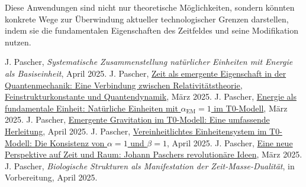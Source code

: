 \documentclass[12pt,a4paper]{article}
\newcommand{\alphaEM}{\alpha_{\text{EM}}}
\begin{document}
	Diese Anwendungen sind nicht nur theoretische Möglichkeiten, sondern könnten konkrete Wege zur Überwindung aktueller technologischer Grenzen darstellen, indem sie die fundamentalen Eigenschaften des Zeitfeldes und seine Modifikation nutzen.
	
	
	\begin{thebibliography}{99}
		 J. Pascher, \textit{Systematische Zusammenstellung natürlicher Einheiten mit Energie als Basiseinheit}, April 2025.
		 J. Pascher, \href{https://github.com/jpascher/T0-Time-Mass-Duality/tree/main/2/pdf/Deutsch/ZeitEmergentQM.pdf}{Zeit als emergente Eigenschaft in der Quantenmechanik: Eine Verbindung zwischen Relativitätstheorie, Feinstrukturkonstante und Quantendynamik}, März 2025.
		 J. Pascher, \href{https://github.com/jpascher/T0-Time-Mass-Duality/tree/main/2/pdf/Deutsch/NatEinheitenAlpha1.pdf}{Energie als fundamentale Einheit: Natürliche Einheiten mit $\alphaEM = 1$ im T0-Modell}, März 2025.
		 J. Pascher, \href{https://github.com/jpascher/T0-Time-Mass-Duality/tree/main/2/pdf/Deutsch/EmergentGravT0.pdf}{Emergente Gravitation im T0-Modell: Eine umfassende Herleitung}, April 2025.
		 J. Pascher, \href{https://github.com/jpascher/T0-Time-Mass-Duality/tree/main/2/pdf/Deutsch/Alpha1Beta1Konsistenz.pdf}{Vereinheitlichtes Einheitensystem im T0-Modell: Die Konsistenz von $\alpha = 1$ und $\beta = 1$}, April 2025.
		 J. Pascher, \href{https://github.com/jpascher/T0-Time-Mass-Duality/tree/main/2/pdf/Deutsch/ZeitRaumPascher.pdf}{Eine neue Perspektive auf Zeit und Raum: Johann Paschers revolutionäre Ideen}, März 2025.
		 J. Pascher, \textit{Biologische Strukturen als Manifestation der Zeit-Masse-Dualität}, in Vorbereitung, April 2025.
	\end{thebibliography}
	
	
\end{document}

